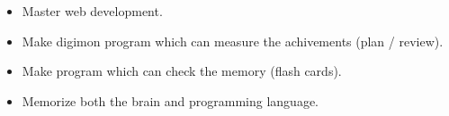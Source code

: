 \vspace{2cm}
\begin{itemize}
    \item[\first] Master web development.
    \item[\second] Make digimon program which can measure the achivements (plan / review).
    \item[\third] Make program which can check the memory (flash cards).
    \item[\forth] Memorize both the brain and programming language.
\end{itemize}
